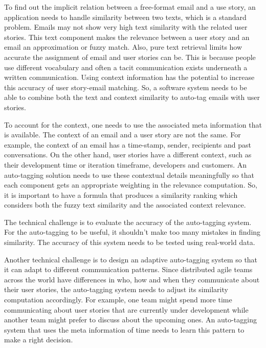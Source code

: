 To find out the implicit relation between a free-format email and a use story, an application needs to handle similarity between two texts, which is a standard problem. Emails may not show very high text similarity with the related user stories. This text component makes the relevance between a user story and an email an approximation or fuzzy match. Also, pure text retrieval limits how accurate the assignment of email and user stories can be. This is because people use different vocabulary and often a tacit communication exists underneath a written communication. Using context information has the potential to increase this accuracy of user story-email matching. So, a software system needs to be able to combine both the text and context similarity to auto-tag emails with user stories.

To account for the context, one needs to use the associated meta information that is available. The context of an email and a user story are not the same. For example, the context of an email has a time-stamp, sender, recipients and past conversations. On the other hand, user stories have a different context, such as their development time or iteration timeframe, developers and customers. An auto-tagging solution needs to use these contextual details meaningfully so that each component gets an appropriate weighting in the relevance computation. So, it is important to have a formula that produces a similarity ranking which considers both the fuzzy text similarity and the associated context relevance.

The technical challenge is to evaluate the accuracy of the auto-tagging system. For the auto-tagging to be useful, it shouldn't make too many mistakes in finding similarity. The accuracy of this system needs to be tested using real-world data. 

Another technical challenge is to design an adaptive auto-tagging system so that it can adapt to different communication patterns. Since distributed agile teams across the world have differences in who, how and when they communicate about their user stories, the auto-tagging system needs to adjust its similarity computation accordingly. For example, one team might spend more time communicating about user stories that are currently under development while another team might prefer to discuss about the upcoming ones. An auto-tagging system that uses the meta information of time needs to learn this pattern to make a right decision.


